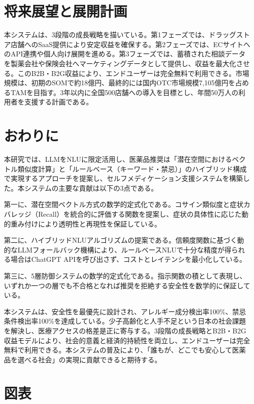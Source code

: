 \documentclass[a4paper,11pt]{bxjsarticle}
\theoremstyle{definition}
\begin{document}
\section{将来展望と展開計画}

本システムは、3段階の成長戦略を描いている。第1フェーズでは、ドラッグストア店舗へのSaaS提供により安定収益を確保する。第2フェーズでは、ECサイトへのAPI連携や個人向け展開を進める。第3フェーズでは、蓄積された相談データを製薬会社や保険会社へマーケティングデータとして提供し、収益を最大化させる。このB2B・B2G収益により、エンドユーザーは完全無料で利用できる。市場規模は、初期のSOMで約18億円、最終的には国内OTC市場規模7,105億円を占めるTAMを目指す。3年以内に全国500店舗への導入を目標とし、年間50万人の利用者を支援する計画である。

\section{おわりに}

本研究では、LLMをNLUに限定活用し、医薬品推奨は「潜在空間におけるベクトル類似度計算」と「ルールベース（キーワード・禁忌）」のハイブリッド構成で実現するアプローチを提案し、セルフメディケーション支援システムを構築した。本システムの主要な貢献は以下の3点である。

第一に、潜在空間ベクトル方式の数学的定式化である。コサイン類似度と症状カバレッジ（Recall）を統合的に評価する関数を提案し、症状の具体性に応じた動的重み付けにより透明性と再現性を保証している。

第二に、ハイブリッドNLUアルゴリズムの提案である。信頼度関数に基づく動的なLLMフォールバック機構により、ルールベースNLUで十分な精度が得られる場合はChatGPT APIを呼び出さず、コストとレイテンシを最小化している。

第三に、5層防御システムの数学的定式化である。指示関数の積として表現し、いずれか一つの層でも不合格となれば推奨を拒絶する安全性を数学的に保証している。

本システムは、安全性を最優先に設計され、アレルギー成分検出率100\%、禁忌条件検出率100\%を達成している。少子高齢化と人手不足という日本の社会課題を解決し、医療アクセスの格差是正に寄与する。3段階の成長戦略とB2B・B2G収益モデルにより、社会的意義と経済的持続性を両立し、エンドユーザーは完全無料で利用できる。本システムの普及により、「誰もが、どこでも安心して医薬品を選べる社会」の実現に貢献できると期待する。

\newpage
\thispagestyle{empty}
\section*{図表}
\end{document}
